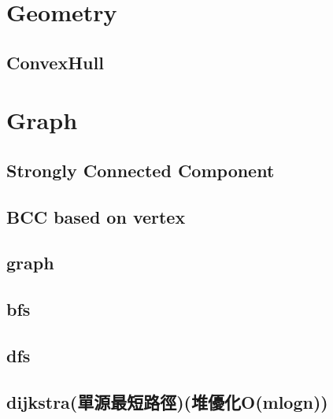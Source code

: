 \documentclass[a4paper,10pt,twocolumn,oneside]{article}
\begin{document}
% 

% 

\section{Geometry}

\subsection{ConvexHull}


\section{Graph}

\subsection{Strongly Connected Component}


\subsection{BCC based on vertex}


\subsection{graph}


\subsection{bfs}


\subsection{dfs}


\subsection{dijkstra(單源最短路徑)(堆優化O(mlogn))}

\end{document}
